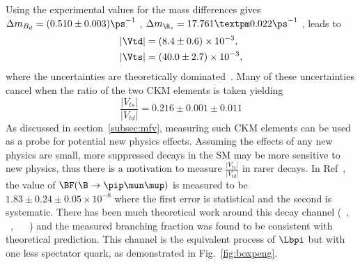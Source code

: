 Using the experimental values for the mass differences gives $\Delta m_{B_{d}} = (0.510\pm0.003)\ps^{-1}$ \cite{pdg},  $\Delta m_{\B_{s}} = 17.761 ± 0.022\ps^{-1}$ \cite{bslhcb}, leads to
\begin{equation}
  \begin{split}
    & |\Vtd| = (8.4\pm0.6)\times 10^{-3},\\
    & |\Vts| = (40.0\pm2.7)\times 10^{-3},
  \end{split}
\end{equation}
where the uncertainties are theoretically dominated~\cite{pdg}. Many of these uncertainties cancel when the ratio of the two CKM elements is taken yielding
\begin{equation}
  \frac{|V_{ts}|}{|V_{td}|} = 0.216\pm0.001\pm 0.011
  \label{eq:vtsvtd}
\end{equation}
As discussed in section~\ref{subsec:mfv}, measuring such CKM elements can be used as a probe for potential new physics effects. Assuming the effects of any new physics are small, more suppressed decays in the SM may be more sensitive to new physics, thus there is a motivation to measure $\frac{|V_{ts}|}{|V_{td}|}$ in rarer decays.
In Ref~\cite{pimumunew}, the value of $\BF(\B\to\pip\mun\mup)$ is measured to be $1.83\pm0.24\pm0.05 \times 10^{-8}$ where the first error is statistical and the second is systematic. There has been much theoretical work around this decay channel (~\cite{bpipi_th_1}, ~\cite{bpipi_th_2}, ~\cite{bpipi_th_3} ~\cite{bpipi_th_4}) and the measured branching fraction was found to be consistent with theoretical prediction.  This channel is the equivalent process of $\Lbpi$ but with one less spectator quark, as demonstrated in Fig.~\ref{fig:boxpeng}.


